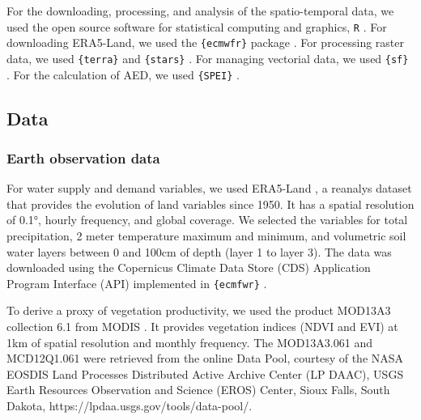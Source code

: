 \documentclass[
  number,
  preprint,
  3p,
  onecolumn]{elsarticle}
\begin{document}
For the downloading, processing, and analysis of the spatio-temporal
data, we used the open source software for statistical computing and
graphics, \texttt{R} \citep{R2023}. For downloading ERA5-Land, we used
the \texttt{\{ecmwfr\}} package \citep{Hufkens2019}. For processing
raster data, we used \texttt{\{terra\}} \citep{Hijmans2023} and
\texttt{\{stars\}} \citep{Pebesma2023}. For managing vectorial data, we
used \texttt{\{sf\}} \citep{Pebesma2018}. For the calculation of AED, we
used \texttt{\{SPEI\}} \citep{Bergueria2023}.

\hypertarget{data}{%
\subsection{Data}\label{data}}

\hypertarget{earth-observation-data}{%
\subsubsection{Earth observation data}\label{earth-observation-data}}

For water supply and demand variables, we used ERA5-Land
\citep{MunozSabater2021}, a reanalys dataset that provides the evolution
of land variables since 1950. It has a spatial resolution of 0.1°,
hourly frequency, and global coverage. We selected the variables for
total precipitation, 2 meter temperature maximum and minimum, and
volumetric soil water layers between 0 and 100cm of depth (layer 1 to
layer 3). The data was downloaded using the Copernicus Climate Data
Store (CDS) Application Program Interface (API) implemented in
\texttt{\{ecmfwr\}} \citep{Hufkens2019}.

To derive a proxy of vegetation productivity, we used the product
MOD13A3 collection 6.1 from MODIS \citep{Didan2015}. It provides
vegetation indices (NDVI and EVI) at 1km of spatial resolution and
monthly frequency. The MOD13A3.061 and MCD12Q1.061 were retrieved from
the online Data Pool, courtesy of the NASA EOSDIS Land Processes
Distributed Active Archive Center (LP DAAC), USGS Earth Resources
Observation and Science (EROS) Center, Sioux Falls, South Dakota,
https://lpdaa.usgs.gov/tools/data-pool/.
\end{document}
